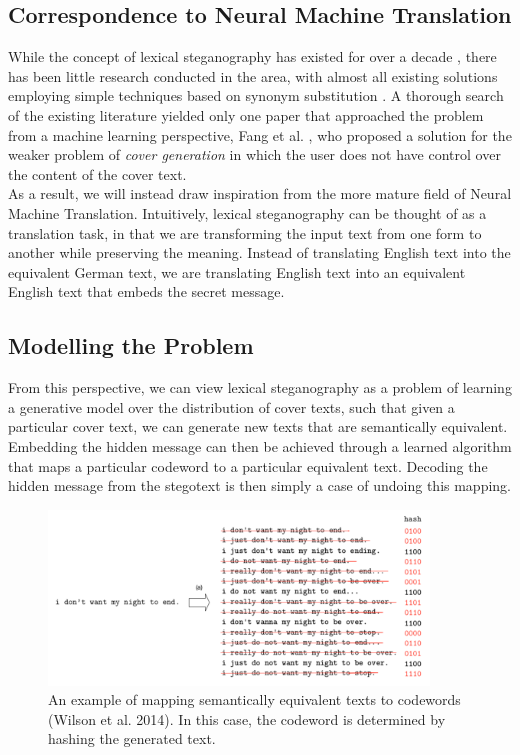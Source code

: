 \documentclass[11pt,a4paper]{article}
\begin{document}
\subsection *{Correspondence to Neural Machine Translation}
  While the concept of lexical steganography has existed for over a decade \cite{tlex}, there has been little research conducted in the area, with almost all existing solutions employing simple techniques based on synonym substitution \cite{universal}. A thorough search of the existing literature yielded only one paper that approached the problem from a machine learning perspective, Fang et al. \citeyear{lstm}, who proposed a solution for the weaker problem of \textit{cover generation} in which the user does not have control over the content of the cover text.\\
  As a result, we will instead draw inspiration from the more mature field of Neural Machine Translation. Intuitively, lexical steganography can be thought of as a translation task, in that we are transforming the input text from one form to another while preserving the meaning. Instead of translating English text into the equivalent German text, we are translating English text into an equivalent English text that embeds the secret message.
  

\subsection *{Modelling the Problem}

  From this perspective, we can view lexical steganography as a problem of learning a generative model over the distribution of cover texts, such that given a particular cover text, we can generate new texts that are semantically equivalent. Embedding the hidden message can then be achieved through a learned algorithm that maps a particular codeword to a particular equivalent text. Decoding the hidden message from the stegotext is then simply a case of undoing this mapping.\\

  \begin{figure}[htp]
    \centering
    \includegraphics[width=0.9\textwidth]{mapping.png}
    \caption{An example of mapping semantically equivalent texts to codewords (Wilson et al. 2014). In this case, the codeword is determined by hashing the generated text.}
    \label{mapping}
  \end{figure}
\end{document}
